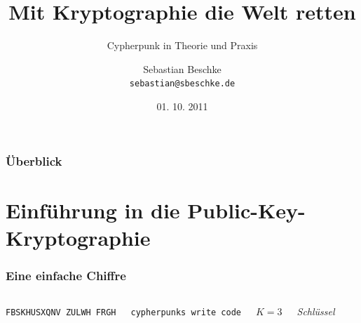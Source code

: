 \documentclass{beamer}
\title{Mit Kryptographie die Welt retten}
\subtitle{Cypherpunk in Theorie und Praxis}
\author{Sebastian Beschke \\ \texttt{sebastian@sbeschke.de}}
\institute{Chaostreff Tübingen}
\date{01. 10. 2011}
\begin{document}
\AtBeginSection[]
{
	\begin{frame}
		\begin{center}
		\Large{\insertsection}
		\end{center}
	\end{frame}
}

\begin{frame}
\titlepage
\end{frame}


\begin{frame}
	\frametitle{Überblick}
	\tableofcontents
\end{frame}

\section{Einführung in die Public-Key-Kryptographie}

\begin{frame}
\frametitle{Eine einfache Chiffre}
\begin{columns}

	\texttt{FBSKHUSXQNV ZULWH FRGH}

\pause	\texttt{cypherpunks write code}

\pause	\(K=3\)

	\textit{Schlüssel}

\end{columns}
\end{frame}
\end{document}
